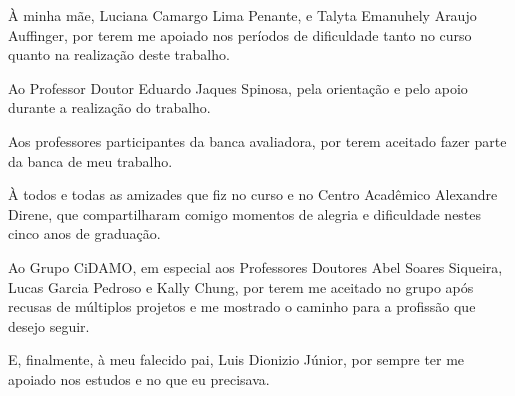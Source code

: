 \begin{agradece}

À minha mãe, Luciana Camargo Lima Penante, e Talyta Emanuhely Araujo Auffinger, por terem me apoiado nos períodos de dificuldade tanto no curso quanto na realização deste trabalho.

Ao Professor Doutor Eduardo Jaques Spinosa, pela orientação e pelo apoio durante a realização do trabalho.

Aos professores participantes da banca avaliadora, por terem aceitado fazer parte da banca de meu trabalho.

À todos e todas as amizades que fiz no curso e no Centro Acadêmico Alexandre Direne, que compartilharam comigo momentos de alegria e dificuldade nestes cinco anos de graduação.

Ao Grupo CiDAMO, em especial aos Professores Doutores Abel Soares Siqueira, Lucas Garcia Pedroso e Kally Chung, por terem me aceitado no grupo após recusas de múltiplos projetos e me mostrado o caminho para a profissão que desejo seguir.

E, finalmente, à meu falecido pai, Luis Dionizio Júnior, por sempre ter me apoiado nos estudos e no que eu precisava.


\end{agradece}

